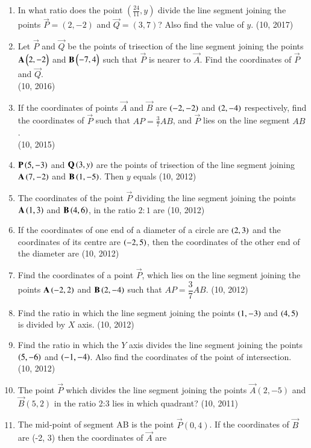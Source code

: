 \begin{enumerate}[label=\thesubsection.\arabic*,ref=\thesubsection.\theenumi]
\item In what ratio does the point $\left(\frac{24}{11}, y\right)$ divide the line segment joining the points $\vec{P} = (2, -2)$ and $\vec{Q} = (3, 7)$? Also find the value of $y$. \hfill (10, 2017)
    \item Let $\vec{P}$ and $\vec{Q}$ be the points of trisection of the line segment joining the points $\mathbf{A} \begin{pmatrix}2,-2\end{pmatrix}$ and $\mathbf{B} \begin{pmatrix}-7, 4\end{pmatrix}$ such that $\vec{P}$ is nearer to $\vec{A}$. Find the coordinates of $\vec{P}$ and $\vec{Q}$.
\\
	    \hfill (10, 2016)
    \item If the coordinates of points $\vec{A}$ and $\vec{B}$ are $\left(-2, -2\right)$ and $\left(2, -4\right)$ respectively, find the coordinates of $\vec{P}$ such that $AP = \frac{3}{7} AB$, and $\vec{P}$ lies on the line segment $AB$. 
	    \\
		\hfill (10, 2015)
\item  $\mathbf{P}\left(5,-3\right)$ and $\mathbf{Q}\left(3,y\right)$ are the points of trisection of the line segment joining $\mathbf{A}\left(7,-2\right)$ and $\mathbf{B}\left(1,-5\right)$. Then $y$ equals
\hfill (10, 2012)
\item The coordinates of the point $\vec{P}$ dividing the line segment joining the points $\mathbf{A}\left(1,3\right)$ and $\mathbf{B}\left(4,6\right)$, in the ratio $2:1$ are
\hfill (10, 2012)
\item If the coordinates of one end of a diameter of a circle are $\left(2,3\right)$ and the coordinates of its centre are $\left(-2,5\right)$, then the coordinates of the other end of the diameter are
\hfill (10, 2012)
\item Find the coordinates of a point $\vec{P}$, which lies on the line segment joining the points $\mathbf{A}\left(-2,2\right)$ and $\mathbf{B}\left(2,-4\right)$ such that $AP = \dfrac{3}{7} AB$. 
\hfill (10, 2012)
\item Find the ratio in which the line segment joining the points $\left(1,-3\right)$ and $\left(4,5\right)$ is divided by $X$ axis. 
\hfill (10, 2012)
\item Find the ratio in which the $Y$ axis divides the line segment joining the points $\left(5,-6\right)$ and $\left(-1,-4\right)$. Also find the coordinates of the point of intersection. 
\hfill (10, 2012)
    \item The point $\vec{P}$ which divides the line segment joining the points $\vec{A}(2, - 5)$ and $\vec{B}(5, 2)$ in the ratio 2:3 lies in which quadrant?
\hfill (10, 2011)
    \item The mid-point of segment AB is the point $\vec{P}( 0, 4)$. If the coordinates of $\vec{B}$ are (-2, 3) then the coordinates of $\vec{A}$ are

\end{enumerate}
